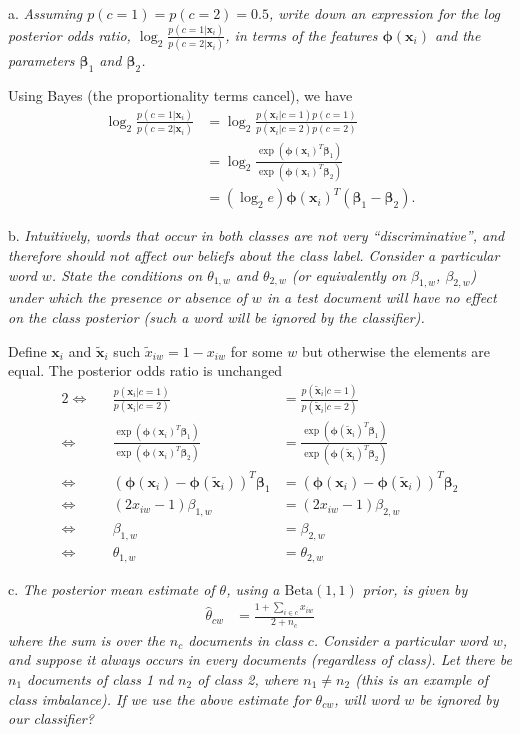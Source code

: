 a. \textit{Assuming $p(c=1) = p(c=2) = 0.5$, write down an expression for the log posterior odds ratio, $\log_2\frac{p(c=1|\bm{x}_i)}{p(c=2|\bm{x}_i)}$, in terms of the features $\bm\phi(\bm{x}_i)$ and the parameters $\bm\beta_1$ and $\bm\beta_2$.}

Using Bayes (the proportionality terms cancel), we have
\begin{align*}
\log_2\frac{p(c=1|\mathbf{x}_i)}{p(c=2|\mathbf{x}_i)} &= \log_2\frac{p(\mathbf{x}_i|c=1)p(c=1)}{p(\mathbf{x}_i|c=2)p(c=2)}\\
&= \log_2\frac{\exp(\bm\phi(\mathbf{x}_i)^T \bm\beta_1)}{\exp(\bm\phi(\mathbf{x}_i)^T \bm\beta_2)}\\
&= (\log_2e)\bm\phi(\mathbf{x}_i)^T(\bm\beta_1-\bm\beta_2).
\end{align*}

b. \textit{Intuitively, words that occur in both classes are not very ``discriminative'', and therefore should not affect our beliefs about the class label. Consider a particular word $w$. State the conditions on $\theta_{1,w}$ and $\theta_{2,w}$ (or equivalently on $\beta_{1,w}$, $\beta_{2,w}$) under which the presence or absence of $w$ in a test document will have no effect on the class posterior (such a word will be ignored by the classifier).}

Define $\bm{x}_i$ and $\bm{\tilde{x}}_i$ such $\tilde{x}_{iw} = 1-x_{iw}$ for some $w$ but otherwise the elements are equal. The posterior odds ratio is unchanged
\begin{alignat*}{2}
\iff&& \frac{p(\mathbf{x}_i|c=1)}{p(\mathbf{x}_i|c=2)} &= \frac{p(\mathbf{\tilde{x}}_i|c=1)}{p(\mathbf{\tilde{x}}_i|c=2)}\\
\iff&& \frac{\exp(\bm\phi(\mathbf{x}_i)^T \bm\beta_1)}{\exp(\bm\phi(\mathbf{x}_i)^T \bm\beta_2)} &= \frac{\exp(\bm\phi(\mathbf{\tilde{x}}_i)^T \bm\beta_1)}{\exp(\bm\phi(\mathbf{\tilde{x}}_i)^T \bm\beta_2)}\\
\iff&& (\bm\phi(\mathbf{x}_i)-\bm\phi(\mathbf{\tilde{x}}_i))^T \bm\beta_1 &= (\bm\phi(\mathbf{x}_i)-\bm\phi(\mathbf{\tilde{x}}_i))^T \bm\beta_2\\
\iff&& (2x_{iw}-1) \beta_{1,w} &= (2x_{iw}-1) \beta_{2,w}\\
\iff&& \beta_{1,w} &= \beta_{2,w}\\
\iff&& \theta_{1,w} &= \theta_{2,w}
\end{alignat*}

c. \textit{The posterior mean estimate of $\theta$, using a $\text{Beta}(1,1)$ prior, is given by}
\begin{align*}
\hat\theta_{cw} &= \frac{1+\sum_{i\in c}x_{iw}}{2+n_c}
\end{align*}
\textit{where the sum is over the $n_c$ documents in class $c$. Consider a particular word $w$, and suppose it always occurs in every documents (regardless of class). Let there be $n_1$ documents of class 1 nd $n_2$ of class 2, where $n_1\neq n_2$ (this is an example of class imbalance). If we use the above estimate for $\theta_{cw}$, will word $w$ be ignored by our classifier?}

